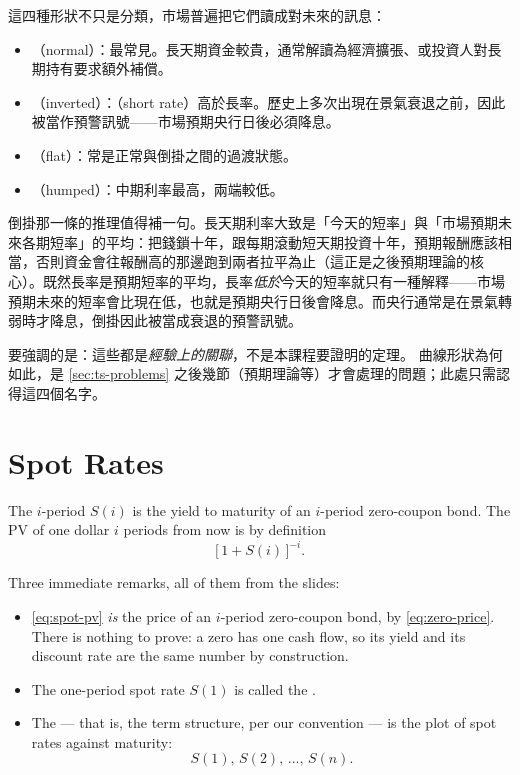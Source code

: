 \begin{remark}
	這四種形狀不只是分類，市場普遍把它們讀成對未來的訊息：
	\begin{itemize}[nosep]
		\item {}（normal）：最常見。長天期資金較貴，通常解讀為經濟擴張、或投資人對長期持有要求額外補償。
		\item {}（inverted）：（short rate）高於長率。歷史上多次出現在景氣衰退之前，因此被當作預警訊號——市場預期央行日後必須降息。
		\item {}（flat）：常是正常與倒掛之間的過渡狀態。
		\item {}（humped）：中期利率最高，兩端較低。
	\end{itemize}
	倒掛那一條的推理值得補一句。長天期利率大致是「今天的短率」與「市場預期未來各期短率」的平均：把錢鎖十年，跟每期滾動短天期投資十年，預期報酬應該相當，否則資金會往報酬高的那邊跑到兩者拉平為止（這正是之後預期理論的核心）。既然長率是預期短率的平均，長率\emph{低於}今天的短率就只有一種解釋——市場預期未來的短率會比現在低，也就是預期央行日後會降息。而央行通常是在景氣轉弱時才降息，倒掛因此被當成衰退的預警訊號。

	要強調的是：這些都是\emph{經驗上的關聯}，不是本課程要證明的定理。
	曲線形狀為何如此，是 \autoref{sec:ts-problems} 之後幾節（預期理論等）才會處理的問題；此處只需認得這四個名字。
\end{remark}
\suppend

\section{Spot Rates}


\begin{definition}
	The $i$-period  $S(i)$ is the yield to maturity of an $i$-period zero-coupon bond.
	The PV of one dollar $i$ periods from now is by definition
	\begin{equation}
		\bigl[\,1+S(i)\,\bigr]^{-i}. \label{eq:spot-pv}
	\end{equation}
\end{definition}

Three immediate remarks, all of them from the slides:

\begin{itemize}[itemsep=0.35em]
	\item \eqref{eq:spot-pv} \emph{is} the price of an $i$-period zero-coupon bond, by \eqref{eq:zero-price}.
	      There is nothing to prove: a zero has one cash flow, so its yield and its discount rate are the same number by construction.
	\item The one-period spot rate $S(1)$ is called the .
	\item The  --- that is, the term structure, per our convention --- is the plot of spot rates against maturity:
	      \[
		      S(1),\,S(2),\,\ldots,\,S(n).
	      \]
\end{itemize}

